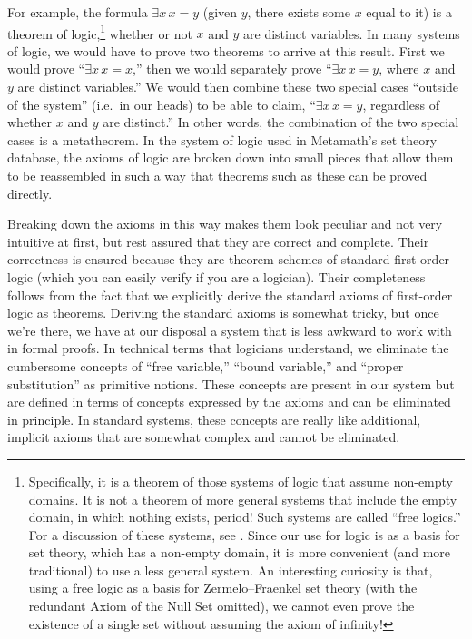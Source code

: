 For example, the formula $\exists x \, x = y $ (given $y$, there exists some
$x$ equal to it) is a theorem of logic,\footnote{Specifically, it is a theorem
of those systems of logic that assume non-empty domains.  It is not a theorem
of more general systems that include the empty domain, in
which nothing exists, period!  Such systems are called ``free
logics.'' For a discussion of these systems, see
\cite{Leblanc}.  Since our use for logic is as a basis
for set theory, which has a non-empty domain, it is more convenient (and more
traditional) to use a less general system.  An interesting curiosity is that,
using a free logic as a basis for Zermelo--Fraenkel set
theory (with the redundant Axiom of the
Null Set omitted), we cannot even prove the
existence of a single set without assuming the axiom of infinity!} whether or not $x$ and $y$ are distinct variables.  In many systems of logic, we would have to prove two theorems to
arrive at this result.  First we would prove ``$\exists x \, x = x $,'' then
we would separately prove ``$\exists x \, x = y $, where $x$ and $y$ are
distinct variables.''  We would then combine these two special cases ``outside
of the system'' (i.e.\ in our heads) to be able to claim, ``$\exists x \, x =
y $, regardless of whether $x$ and $y$ are distinct.''  In other words, the
combination of the two special cases is a
metatheorem.  In the system of logic
used in Metamath's set theory
database, the axioms of logic are broken down into small pieces that allow
them to be reassembled in such a way that theorems such as these can be proved
directly.

Breaking down the axioms in this way makes them look peculiar and not very
intuitive at first, but rest assured that they are correct and complete.  Their
correctness is ensured because they are theorem schemes of standard first-order
logic (which you can easily verify if you are a logician).  Their completeness
follows from the fact that we explicitly derive the standard axioms of
first-order logic as theorems.  Deriving the standard axioms is somewhat
tricky, but once we're there, we have at our disposal a system that is less
awkward to work with in formal proofs.  In technical terms
that logicians understand, we eliminate the cumbersome concepts of ``free
variable,'' ``bound variable,'' and
``proper substitution''
as primitive notions.  These concepts are present in our system but are
defined in terms of concepts expressed by the axioms and can be eliminated in
principle.  In standard systems, these concepts are really like additional,
implicit axioms that are somewhat complex and cannot be
eliminated.

